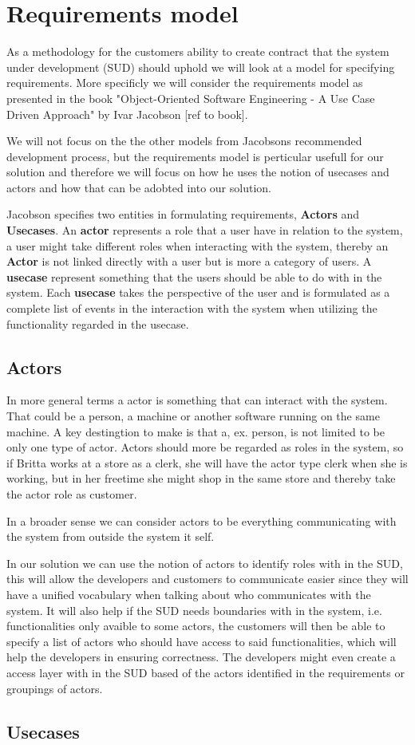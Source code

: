 \section{Requirements model}

As a methodology for the customers ability to create contract that the system under development (SUD) should uphold we will look at a model for specifying requirements.
More specificly we will consider the requirements model as presented in the book "Object-Oriented Software Engineering - A Use Case Driven Approach" by Ivar Jacobson [ref to book].

We will not focus on the the other models from Jacobsons recommended development process, but the requirements model is perticular usefull for our solution and therefore we will focus on how he uses the notion of usecases and actors and how that can be adobted into our solution.

Jacobson specifies two entities in formulating requirements, \textbf{Actors} and \textbf{Usecases}.
An \textbf{actor} represents a role that a user have in relation to the system, a user might take different roles when interacting with the system, thereby an \textbf{Actor} is not linked directly with a user but is more a category of users.
A \textbf{usecase} represent something that the users should be able to do with in the system. Each \textbf{usecase} takes the perspective of the user and is formulated as a complete list of events in the interaction with the system when utilizing the functionality regarded in the usecase.

\subsection{Actors}
In more general terms a actor is something that can interact with the system. That could be a person, a machine or another software running on the same machine. 
A key destingtion to make is that a, ex. person, is not limited to be only one type of actor.
Actors should more be regarded as roles in the system, so if Britta works at a store as a clerk, she will have the actor type clerk when she is working, but in her freetime she might shop in the same store and thereby take the actor role as customer. 

In a broader sense we can consider actors to be everything communicating with the system from outside the system it self.

In our solution we can use the notion of actors to identify roles with in the SUD, this will allow the developers and customers to communicate easier since they will have a unified vocabulary when talking about who communicates with the system. 
It will also help if the SUD needs boundaries with in the system, i.e. functionalities only avaible to some actors, the customers will then be able to specify a list of actors who should have access to said functionalities, which will help the developers in ensuring correctness.
The developers might even create a access layer with in the SUD based of the actors identified in the requirements or groupings of actors.

\subsection{Usecases}